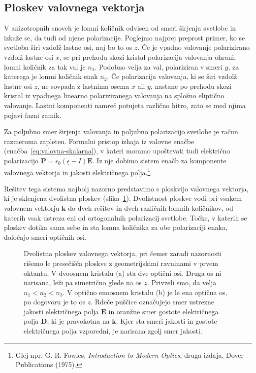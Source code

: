 \subsection*{Ploskev valovnega vektorja}
V anizotropnih snoveh je lomni količnik odvisen od smeri 
širjenja svetlobe in izkaže se, da tudi od njene polarizacije. Poglejmo 
najprej preprost primer, ko se svetloba širi vzdolž lastne osi, naj bo to os $z$.
Če je vpadno valovanje polarizirano vzdolž lastne osi $x$, se pri prehodu
skozi kristal polarizacija valovanja ohrani, lomni količnik za
tak val je $n_{1}$. Podobno velja za val, polariziran v smeri
$y$, za katerega je lomni količnik enak $n_{2}$. Če polarizacija valovanja, 
ki se širi vzdolž lastne osi $z$, ne sovpada z lastnima osema $x$ ali $y$, nastane po 
prehodu skozi kristal iz vpadnega linearno polariziranega valovanja na splošno eliptično valovanje. Lastni komponenti namreč potujeta različno
hitro, zato se med njima pojavi fazni zamik. 

Za poljubno smer širjenja valovanja in poljubno polarizacijo svetlobe je račun razmeroma zapleten. 
Formalni pristop izhaja iz valovne enačbe (enačba~\ref{eq:valovna-skalarna}), v kateri
moramo upoštevati tudi električno polarizacijo 
$\mathbf{P} = \epsilon_{0}(\underline{\epsilon}-I)\mathbf{E}$. Iz nje dobimo 
sistem enačb za komponente valovnega vektorja in jakosti električnega polja.\footnote{Glej 
npr. G. R. Fowles, {\it Introduction to Modern Optics}, druga izdaja, Dover Publications (1975).}

Rešitev tega sistema najbolj nazorno predstavimo s ploskvijo valovnega vektorja, 
ki je sklenjena dvolistna ploskev (slika~\ref{kploskev}). Dvolistnost ploskve
vodi pri vsakem valovnem vektorju $\mathbf{k}$ do dveh rešitev in dveh različnih lomnih
količnikov, od katerih vsak ustreza eni od ortogonalnih polarizacij svetlobe. Točke, v katerih
se ploskev dotika sama sebe in sta lomna količnika za obe polarizaciji enaka, 
določajo smeri optičnih osi. 
\begin{figure}[h]
\centering
\def\svgwidth{140truemm} 

\caption{Dvolistna ploskev valovnega vektorja, pri čemer zaradi nazornosti rišemo le presečišča
ploskve z geometrijskimi ravninami v prvem oktantu. 
V dvoosnem kristalu (a) sta dve optični osi. Druga os ni narisana, leži pa 
simetrično glede na os $z$. Privzeli smo, da velja $n_1<n_2<n_3$.
V optično enoosnem kristalu (b) je le ena optična os, 
po dogovoru je to os $z$. Rdeče puščice označujejo smer ustrezne jakosti električnega polja $\mathbf{E}$
in oranžne smer gostote električnega polja $\mathbf{D}$, ki je pravokotna na $\mathbf{k}$. 
Kjer sta smeri jakosti in gostote električnega polja vzporedni, je narisana zgolj smer jakosti.}
\label{kploskev}
\end{figure}


